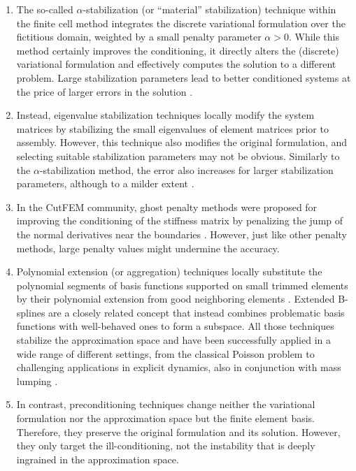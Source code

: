 \documentclass{article}
\numberwithin{equation}{section}
\theoremstyle{definition}
\begin{document}
\begin{enumerate}[noitemsep]
    \item The so-called $\alpha$-stabilization (or ``material'' stabilization) technique within the finite cell method \cite{parvizian2007finite,schillinger2015finite} integrates the discrete variational formulation over the fictitious domain, weighted by a small penalty parameter $\alpha > 0$. While this method certainly improves the conditioning, it directly alters the (discrete) variational formulation and effectively computes the solution to a different problem. Large stabilization parameters lead to better conditioned systems at the price of larger errors in the solution \cite{garhuom2022eigenvalue,sartorti2025stabilization}. 
    \item Instead, eigenvalue stabilization techniques \cite{garhuom2022eigenvalue,eisentrager2024eigenvalue,sartorti2025stabilization} locally modify the system matrices by stabilizing the small eigenvalues of element matrices prior to assembly. However, this technique also modifies the original formulation, and selecting suitable stabilization parameters may not be obvious. Similarly to the $\alpha$-stabilization method, the error also increases for larger stabilization parameters, although to a milder extent \cite{garhuom2022eigenvalue}.
    \item In the CutFEM community, ghost penalty methods were proposed for improving the conditioning of the stiffness matrix by penalizing the jump of the normal derivatives near the boundaries \cite{burman2012fictitious,burman2015cutfem}. However, just like other penalty methods, large penalty values might undermine the accuracy.
    \item Polynomial extension (or aggregation) techniques locally substitute the polynomial segments of basis functions supported on small trimmed elements by their polynomial extension from good neighboring elements \cite{buffa2020minimal,burman2023extension}. Extended B-splines \cite{hollig2003finite,hollig2005introduction,hollig2003nonuniform,marussig2017stable,marussig2018improved} are a closely related concept that instead combines problematic basis functions with well-behaved ones to form a subspace. All those techniques stabilize the approximation space and have been successfully applied in a wide range of different settings, from the classical Poisson problem \cite{buffa2020minimal,burman2023extension} to challenging applications in explicit dynamics, also in conjunction with mass lumping \cite{burman2022explicit,voet2025stabilization,guarino2025stabilization}.
    \item In contrast, preconditioning techniques \cite{de2017condition,de2019preconditioning,de2020multigrid,jomo2019robust} change neither the variational formulation nor the approximation space but the finite element basis. Therefore, they preserve the original formulation and its solution. However, they only target the ill-conditioning, not the instability that is deeply ingrained in the approximation space.
\end{enumerate}
\end{document}
